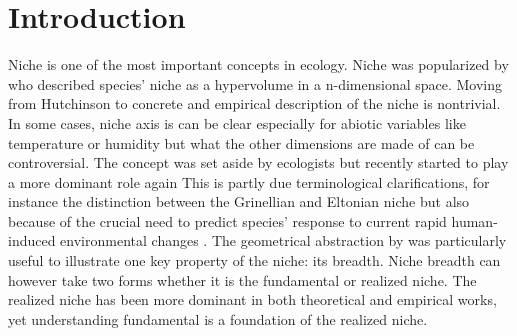 \section*{Introduction}
Niche is one of the most important concepts in ecology.
Niche was popularized by \citet{Hutchinson1957} who described species' niche as a hypervolume in a n-dimensional space.
Moving from Hutchinson to concrete and empirical description of the niche is nontrivial.
In some cases, niche axis is can be clear especially for abiotic variables like temperature or humidity but what the other dimensions are made of can be controversial.
The concept was set aside by ecologists but recently started to play a more dominant role again %
This is partly due terminological clarifications, for instance the distinction between the Grinellian and Eltonian niche \citep{Chase2003} but also because of the crucial need to predict species' response to current rapid human-induced environmental changes \citep[e.g.,][]{Parmesan2006, Kearney2009}. %
The geometrical abstraction by \citet{Hutchinson1957} was particularly useful to illustrate one key property of the niche: its breadth.
Niche breadth can however take two forms whether it is the fundamental or realized niche.
The realized niche has been more dominant in both theoretical and empirical works, yet understanding fundamental is a foundation of the realized niche.


